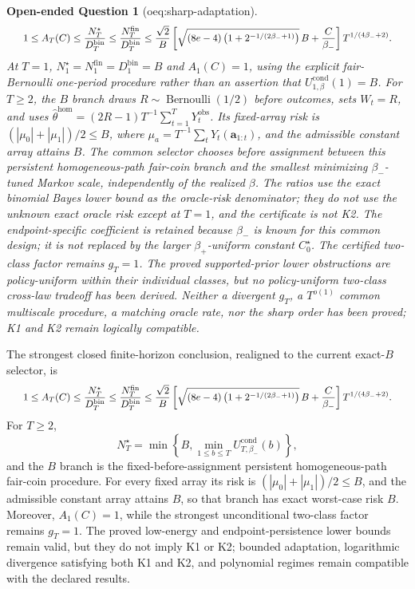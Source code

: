 \documentclass{article}
\newtheorem{openendedquestion}{Open-ended Question}
\begin{document}
\begin{openendedquestion}[oeq:sharp-adaptation]
\[\makebox[\linewidth][c]{\resizebox{0.98\linewidth}{!}{\leavevmode\par\noindent \makebox[\linewidth][c]{\resizebox{0.98\linewidth}{!}{\(\displaystyle \displaystyle 1\le A_T(C)\le\frac{N_T^\star}{D_T^{\mathrm{bin}}}\le\frac{N_T^{\mathrm{fin}}}{D_T^{\mathrm{bin}}}\le\frac{\sqrt2}{B}\left[\sqrt{(8e-4)\left(1+2^{-1/(2\beta_-+1)}\right)}\,B+\frac C{\beta_-}\right]T^{1/(4\beta_-+2)}.\)}}\par\noindent}}
\] At \(T=1\), \(N_1^\star=N_1^{\mathrm{fin}}=D_1^{\mathrm{bin}}=B\) and \(A_1(C)=1\), using the explicit fair-Bernoulli one-period procedure rather than an assertion that \(U_{1,\beta}^{\mathrm{cond}}(1)=B\). For \(T\ge2\), the \(B\) branch draws \(R\sim\operatorname{Bernoulli}(1/2)\) before outcomes, sets \(W_t=R\), and uses \(\widehat\theta^{\mathrm{hom}}=(2R-1)T^{-1}\sum_{t=1}^T Y_t^{\mathrm{obs}}\). Its fixed-array risk is \((|\mu_0|+|\mu_1|)/2\le B\), where \(\mu_a=T^{-1}\sum_tY_t(\mathbf a_{1:t})\), and the admissible constant array attains \(B\). The common selector chooses before assignment between this persistent homogeneous-path fair-coin branch and the smallest minimizing \(\beta_-\)-tuned Markov scale, independently of the realized \(\beta\). The ratios use the exact binomial Bayes lower bound as the oracle-risk denominator; they do not use the unknown exact oracle risk except at \(T=1\), and the certificate is not K2. The endpoint-specific coefficient is retained because \(\beta_-\) is known for this common design; it is not replaced by the larger \(\beta_+\)-uniform constant \(C_0^\star\). The certified two-class factor remains \(g_T=1\). The proved supported-prior lower obstructions are policy-uniform within their individual classes, but no policy-uniform two-class cross-law tradeoff has been derived. Neither a divergent \(g_T\), a \(T^{o(1)}\) common multiscale procedure, a matching oracle rate, nor the sharp order has been proved; K1 and K2 remain logically compatible.
\end{openendedquestion}
The strongest closed finite-horizon conclusion, realigned to the current exact-\(B\) selector, is \[
\makebox[\linewidth][c]{\resizebox{0.98\linewidth}{!}{\leavevmode\par\noindent \makebox[\linewidth][c]{\resizebox{0.98\linewidth}{!}{\(\displaystyle \displaystyle 1\le A_T(C)\le\frac{N_T^\star}{D_T^{\mathrm{bin}}}\le\frac{N_T^{\mathrm{fin}}}{D_T^{\mathrm{bin}}}\le\frac{\sqrt2}{B}\left[\sqrt{(8e-4)\left(1+2^{-1/(2\beta_-+1)}\right)}\,B+\frac C{\beta_-}\right]T^{1/(4\beta_-+2)}.\)}}\par\noindent}}
\] For \(T\ge2\), \[N_T^\star=\min\left\{B,\min_{1\le b\le T}U_{T,\beta_-}^{\mathrm{cond}}(b)\right\},\] and the \(B\) branch is the fixed-before-assignment persistent homogeneous-path fair-coin procedure. For every fixed array its risk is \((|\mu_0|+|\mu_1|)/2\le B\), and the admissible constant array attains \(B\), so that branch has exact worst-case risk \(B\). Moreover, \(A_1(C)=1\), while the strongest unconditional two-class factor remains \(g_T=1\). The proved low-energy and endpoint-persistence lower bounds remain valid, but they do not imply K1 or K2; bounded adaptation, logarithmic divergence satisfying both K1 and K2, and polynomial regimes remain compatible with the declared results.
\end{document}
